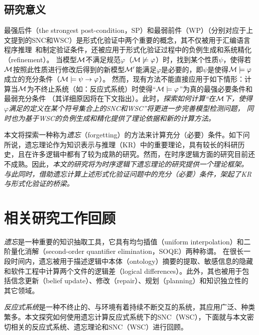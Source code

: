 

\subsection{研究意义}
最强后件（the strongest post-condition，SP）和最弱前件（WP）（分别对应于上文提到的SNC和WSC）是形式化验证中两个重要的概念，其不仅被用于汇编语言程序推理~\cite{legato2002weakest}和制定验证条件\cite{DBLP:journals/ipl/Leino05}，还被应用于形式化验证过程中的负例生成\cite{dailler2018instrumenting}和系统精化（refinement）\cite{woodcock1990refinement}。
当模型${\cal M}$不满足规范$\varphi$（${\cal M}\not \models \varphi$）时，找到某个性质$\psi$，使得若${\cal M}$按照此性质进行修改后得到的新模型${\cal M}'$能满足$\varphi$是必要的，即$\psi$是使得${\cal M}\models \varphi$成立的充分条件（${\cal M} \models \psi\rightarrow \varphi$）。
然而，现有方法不能直接应用于如下情形：计算当${\cal M}$为不终止系统（如：反应式系统）时使得“${\cal M}\models \varphi$”为真的最强必要条件和最弱充分条件
（其详细原因将在下文指出）。此时，\emph{探索如何计算“在${\cal M}$下，使得$\varphi$满足的定义在某个符号集合上的SNC和WSC”将更进一步完善模型检测问题，
同时也为基于WSC的负例生成和精化提供了理论依据和新的计算方法。}

本文将探索一种称为\emph{遗忘}（forgetting）的方法来计算充分（必要）条件。如下问所说，遗忘理论作为知识表示与推理（KR）中的重要理论，具有较长的科研历史，且在许多逻辑中都有了较为成熟的研究。然而，在时序逻辑方面的研究目前还不成熟。因此，\emph{本文的研究将为时序逻辑下遗忘理论的研究提供一个理论框架。
与此同时，借助遗忘计算上述形式化验证问题中的充分（必要）条件，架起了KR与形式化验证的桥梁。}

\section{相关研究工作回顾}
\emph{遗忘}是一种重要的知识抽取工具，它具有均匀插值（uniform interpolation）和二阶量化消解（second-order quantifier elimination，SOQE）两种称谓。
在很长一段时间内，遗忘被用于描述逻辑中本体（ontology）摘要的提取、敏感信息的隐藏和软件工程中计算两个文件的逻辑差（logical differences）。此外，其也被用于包括信念更新（belief update）、修改（repair）、规划（planning）和知识独立性的其它领域。

{\em 反应式系统}是一种不终止的、与环境有着持续不断交互的系统，其应用广泛、种类繁多。本文探究如何使用遗忘计算反应式系统下的SNC（WSC），下面就与本文密切相关的反应式系统、遗忘理论和SNC（WSC）进行回顾。



